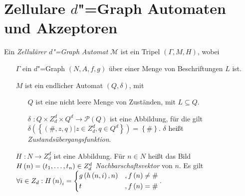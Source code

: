 \documentclass[11pt]{article}
\newcommand{\defWord}[1]{\emph{#1}}
\begin{document}
\section{Zellulare $d$"=Graph Automaten und Akzeptoren}

Ein \defWord{Zellulärer $d$"=Graph Automat} $\mathcal{M}$ ist ein Tripel $\left(\Gamma, M, H\right)$, wobei
\begin{itemize}
	\item[$\Gamma$] ein $d$"=Graph $\left(N, A, f, g\right)$ über einer Menge von Beschriftungen $L$ ist.
	\item[$M$]  ist ein endlicher Automat $\left(Q, \delta\right)$, mit 
	\begin{itemize}
		\item[$Q$] ist eine nicht leere Menge von Zuständen, mit $L \subseteq Q$.
		\item[$\delta$] $: Q \times Z_d^d \times Q^d \rightarrow \mathcal{P}\left(Q\right)$ ist eine Abbildung, für die gilt $\delta \left(\left \{\left(\#, z, q\right) \vert z \in Z_d^d, q \in Q^d\right \}\right) = \left \{\# \right \}$. $\delta$ heißt \defWord{Zustandsübergangsfunktion}.
	\end{itemize}
	\item[$H$] $: N \rightarrow Z_d^d$ ist eine Abbildung. 
	Für $n \in N$ heißt das Bild $H \left(n\right) = \left(t_1, \text{\dots}, t_n\right) \in Z_d^d$ \defWord{Nachbarschaftsvektor} von $n$. Es gilt $\forall i \in Z_d : H\left(n\right)_i = \begin{dcases}
	g\left(h\left(n, i\right), n\right) & ,f\left(n\right) \neq \# \\
	t & , f\left(n\right) = \# \\
	\end{dcases}$.
\end{itemize}
\end{document}
